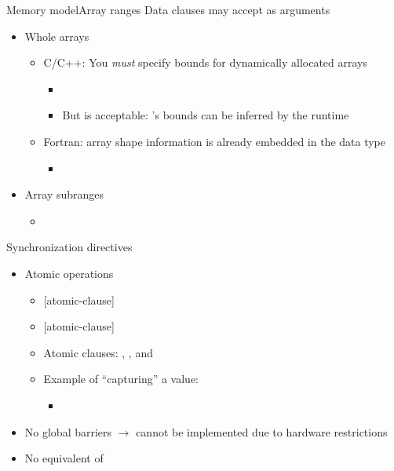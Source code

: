 \documentclass[12pt,aspectratio=169]{beamer}
\begin{document}
\begin{frame}[fragile]{Memory model}{Array ranges}
  Data clauses may accept as arguments
  \begin{itemize}
  \item Whole arrays
    \begin{itemize}
    \item C/C++: You \emph{must} specify bounds for dynamically allocated arrays
      \begin{itemize}
      \item {}
      \item But  is acceptable: 's bounds can be inferred by the runtime
      \end{itemize}
    \item Fortran: array shape information is already embedded in the data type
      \begin{itemize}
      \item {}
      \end{itemize}
    \end{itemize}
  \item Array subranges
    \begin{itemize}
    \item {}
    \end{itemize}
  \end{itemize}
\end{frame}

\begin{frame}[fragile]{Synchronization directives}
  \begin{itemize}
  \item Atomic operations
    \begin{itemize}
    \item {} [atomic-clause]
    \item {} [atomic-clause]
    \item Atomic clauses: , ,
       and 
    \item Example of ``capturing'' a value:
      \begin{itemize}
      \item {}
      \end{itemize}
    \end{itemize}
  \item No global barriers $\rightarrow$ cannot be implemented due to hardware restrictions
  \item No equivalent of 
  \end{itemize}
\end{frame}
\end{document}
